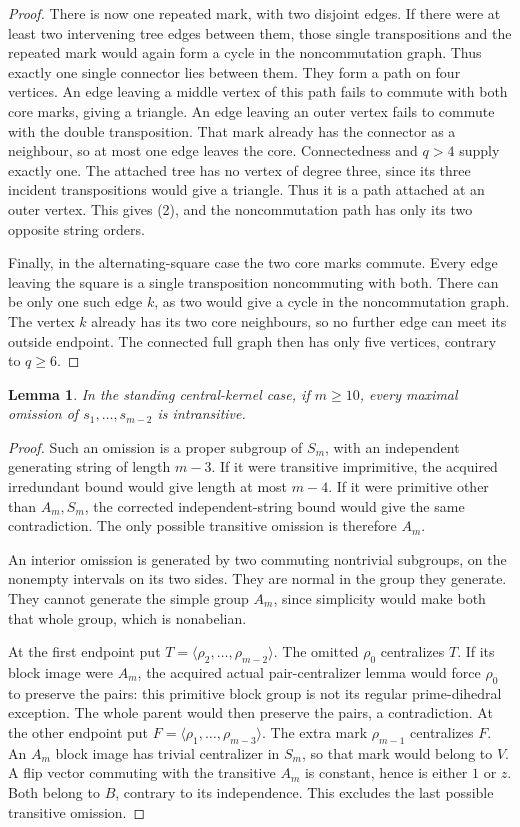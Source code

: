 \documentclass[11pt,a4paper]{article}
\newtheorem{lemma}{Lemma}
\newcommand{\gen}[1]{\langle#1\rangle}
\begin{document}
\begin{proof}
There is now one repeated mark, with two disjoint edges. If
there were at least two intervening tree edges between them,
those single transpositions and the repeated mark would again
form a cycle in the noncommutation graph. Thus exactly one
single connector lies between them. They form a path on four
vertices. An edge leaving a middle vertex of this path fails to
commute with both core marks, giving a triangle. An edge leaving
an outer vertex fails to commute with the double transposition.
That mark already has the connector as a neighbour, so at most
one edge leaves the core. Connectedness and $q>4$ supply exactly
one. The attached tree has no vertex of degree three, since
its three incident transpositions would give a triangle. Thus
it is a path attached at an outer vertex. This gives (2), and
the noncommutation path has only its two opposite string orders.

Finally, in the alternating-square case the two core marks
commute. Every edge leaving the square is a single transposition
noncommuting with both. There can be only one such edge $k$,
as two would give a cycle in the noncommutation graph. The
vertex $k$ already has its two core neighbours, so no further
edge can meet its outside endpoint. The connected full graph
then has only five vertices, contrary to $q\ge6$.
\end{proof}

\begin{lemma}\label{omissions}
In the standing central-kernel case, if $m\ge10$, every
maximal omission of $s_1,\ldots,s_{m-2}$ is intransitive.
\end{lemma}
\begin{proof}
Such an omission is a proper subgroup of $S_m$, with an
independent generating string of length $m-3$. If it were
transitive imprimitive, the acquired irredundant bound would
give length at most $m-4$. If it were primitive other than
$A_m,S_m$, the corrected independent-string bound would give
the same contradiction. The only possible transitive omission
is therefore $A_m$.

An interior omission is generated by two commuting nontrivial
subgroups, on the nonempty intervals on its two sides. They
are normal in the group they generate. They cannot generate
the simple group $A_m$, since simplicity would make both
that whole group, which is nonabelian.

At the first endpoint put $T=\gen{\rho_2,\ldots,\rho_{m-2}}$.
The omitted $\rho_0$ centralizes $T$. If its block image were
$A_m$, the acquired actual pair-centralizer lemma would force
$\rho_0$ to preserve the pairs: this primitive block group is
not its regular prime-dihedral exception. The whole parent
would then preserve the pairs, a contradiction.
At the other endpoint put $F=\gen{\rho_1,\ldots,\rho_{m-3}}$.
The extra mark $\rho_{m-1}$ centralizes $F$. An $A_m$ block
image has trivial centralizer in $S_m$, so that mark would
belong to $V$. A flip vector commuting with the transitive
$A_m$ is constant, hence is either $1$ or $z$. Both belong
to $B$, contrary to its independence. This excludes the
last possible transitive omission.
\end{proof}
\end{document}
